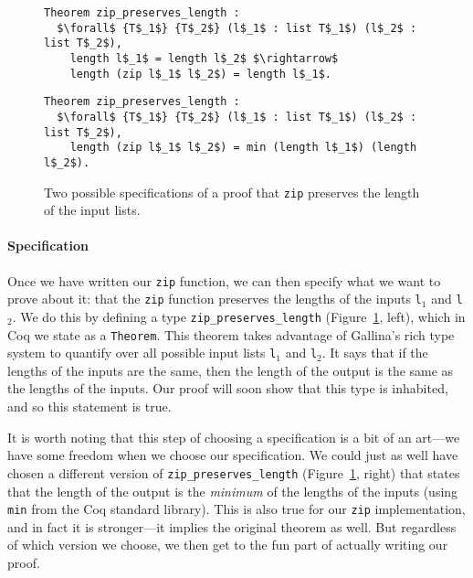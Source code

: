 \begin{figure}
\begin{minipage}{0.49\textwidth}
\begin{lstlisting}
Theorem zip_preserves_length :
  $\forall$ {T$_1$} {T$_2$} (l$_1$ : list T$_1$) (l$_2$ : list T$_2$),
    length l$_1$ = length l$_2$ $\rightarrow$
    length (zip l$_1$ l$_2$) = length l$_1$.
\end{lstlisting}
\end{minipage}
\hfill
\begin{minipage}{0.49\textwidth}
\begin{lstlisting}
Theorem zip_preserves_length :
  $\forall$ {T$_1$} {T$_2$} (l$_1$ : list T$_1$) (l$_2$ : list T$_2$),
    length (zip l$_1$ l$_2$) = min (length l$_1$) (length l$_2$).
\end{lstlisting}
\end{minipage}
\caption{Two possible specifications of a proof that \lstinline{zip} preserves the length of the input lists.}
\label{fig:zip-pres}
\end{figure}

\paragraph{Specification} Once we have written our \lstinline{zip} function, we can then specify what we 
want to prove about it: that the \lstinline{zip} function preserves the lengths of the inputs \lstinline{l}$_1$ and \lstinline{l}$_2$.
We do this by defining a type \lstinline{zip_preserves_length} (Figure~\ref{fig:zip-pres}, left), which in Coq we state as a \lstinline{Theorem}.
This theorem takes advantage of Gallina's rich type system to quantify over all possible input lists \lstinline{l}$_1$ and \lstinline{l}$_2$.
It says that if the lengths of the inputs are the same, then the length of the output is the same as the lengths of the inputs.
Our proof will soon show that this type is inhabited, and so this statement is true.

It is worth noting that this step of choosing a specification is a bit of an art---we have some freedom when we choose our specification.
We could just as well have chosen a different version of \lstinline{zip_preserves_length} (Figure~\ref{fig:zip-pres}, right)
that states that the length of the output is the \textit{minimum} of the lengths of the inputs (using \lstinline{min} from the Coq standard library).
This is also true for our \lstinline{zip} implementation, and in fact it is stronger---it implies the original theorem as well.
But regardless of which version we choose, we then get to the fun part of actually writing our proof.

